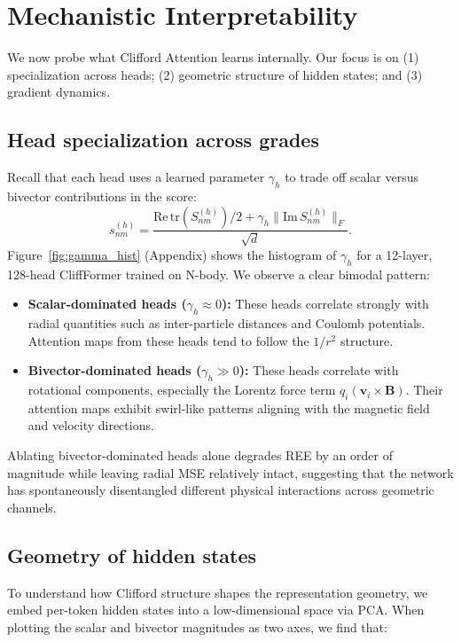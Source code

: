 \documentclass{article}
\theoremstyle{plain}
\theoremstyle{definition}
\theoremstyle{remark}
\begin{document}
\section{Mechanistic Interpretability}
\label{sec:analysis}

We now probe what Clifford Attention learns internally. Our focus is on (1) specialization across heads; (2) geometric structure of hidden states; and (3) gradient dynamics.

\subsection{Head specialization across grades}

Recall that each head uses a learned parameter $\gamma_h$ to trade off scalar versus bivector contributions in the score:
\begin{equation}
    s_{nm}^{(h)} =
    \frac{\mathrm{Re}\,\mathrm{tr}(S_{nm}^{(h)})/2 + \gamma_h \|\mathrm{Im}\,S_{nm}^{(h)}\|_F}{\sqrt{d}}.
\end{equation}
Figure~\ref{fig:gamma_hist} (Appendix) shows the histogram of $\gamma_h$ for a 12-layer, 128-head CliffFormer trained on N-body. We observe a clear bimodal pattern:

\begin{itemize}
    \item \textbf{Scalar-dominated heads ($\gamma_h \approx 0$):} These heads correlate strongly with radial quantities such as inter-particle distances and Coulomb potentials. Attention maps from these heads tend to follow the $1/r^2$ structure.
    \item \textbf{Bivector-dominated heads ($\gamma_h \gg 0$):} These heads correlate with rotational components, especially the Lorentz force term $q_i(\mathbf{v}_i\times\mathbf{B})$. Their attention maps exhibit swirl-like patterns aligning with the magnetic field and velocity directions.
\end{itemize}

Ablating bivector-dominated heads alone degrades REE by an order of magnitude while leaving radial MSE relatively intact, suggesting that the network has spontaneously disentangled different physical interactions across geometric channels.

\subsection{Geometry of hidden states}

To understand how Clifford structure shapes the representation geometry, we embed per-token hidden states into a low-dimensional space via PCA. When plotting the scalar and bivector magnitudes as two axes, we find that:
\end{document}
